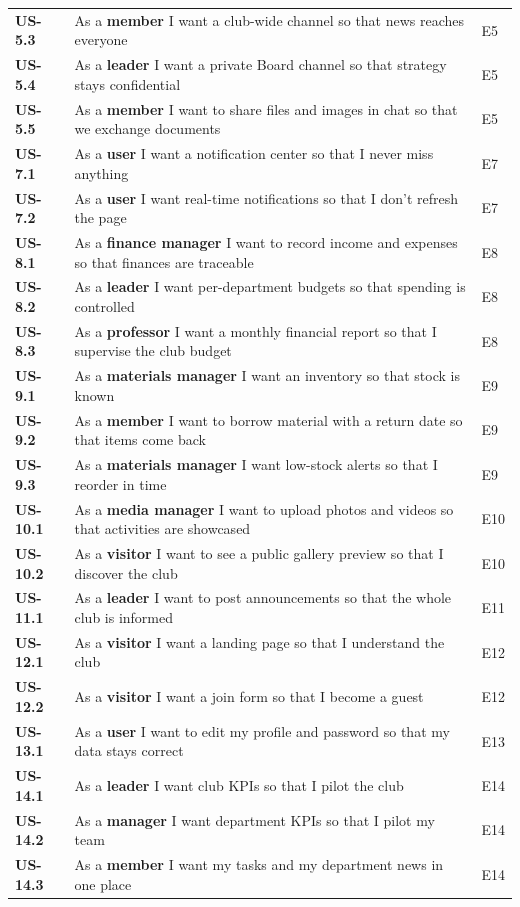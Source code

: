 \documentclass[12pt,a4paper]{report}
\begin{document}
\begin{longtable}{>{\bfseries}p{1.5cm} p{9.6cm} p{2.6cm}}
US-5.3 & As a \textbf{member} I want a club-wide channel so that news reaches everyone & E5 \\
US-5.4 & As a \textbf{leader} I want a private Board channel so that strategy stays confidential & E5 \\
US-5.5 & As a \textbf{member} I want to share files and images in chat so that we exchange documents & E5 \\
US-7.1 & As a \textbf{user} I want a notification center so that I never miss anything & E7 \\
US-7.2 & As a \textbf{user} I want real-time notifications so that I don't refresh the page & E7 \\
US-8.1 & As a \textbf{finance manager} I want to record income and expenses so that finances are traceable & E8 \\
US-8.2 & As a \textbf{leader} I want per-department budgets so that spending is controlled & E8 \\
US-8.3 & As a \textbf{professor} I want a monthly financial report so that I supervise the club budget & E8 \\
US-9.1 & As a \textbf{materials manager} I want an inventory so that stock is known & E9 \\
US-9.2 & As a \textbf{member} I want to borrow material with a return date so that items come back & E9 \\
US-9.3 & As a \textbf{materials manager} I want low-stock alerts so that I reorder in time & E9 \\
US-10.1 & As a \textbf{media manager} I want to upload photos and videos so that activities are showcased & E10 \\
US-10.2 & As a \textbf{visitor} I want to see a public gallery preview so that I discover the club & E10 \\
US-11.1 & As a \textbf{leader} I want to post announcements so that the whole club is informed & E11 \\
US-12.1 & As a \textbf{visitor} I want a landing page so that I understand the club & E12 \\
US-12.2 & As a \textbf{visitor} I want a join form so that I become a guest & E12 \\
US-13.1 & As a \textbf{user} I want to edit my profile and password so that my data stays correct & E13 \\
US-14.1 & As a \textbf{leader} I want club KPIs so that I pilot the club & E14 \\
US-14.2 & As a \textbf{manager} I want department KPIs so that I pilot my team & E14 \\
US-14.3 & As a \textbf{member} I want my tasks and my department news in one place & E14 \\
\bottomrule
\end{longtable}
\end{document}
